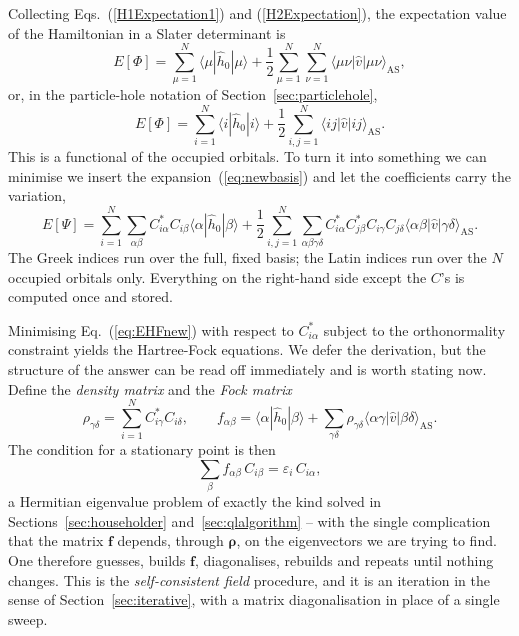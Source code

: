 Collecting Eqs.~(\ref{H1Expectation1}) and (\ref{H2Expectation}), the
expectation value of the Hamiltonian in a Slater determinant is
\begin{equation}
  E[\Phi]
   = \sum_{\mu=1}^{N}\langle\mu|\hat{h}_0|\mu\rangle
   + \frac{1}{2}\sum_{\mu=1}^{N}\sum_{\nu=1}^{N}
     \langle\mu\nu|\hat{v}|\mu\nu\rangle_{\mathrm{AS}} ,
  \label{eq:EHF}
\end{equation}
or, in the particle-hole notation of Section~\ref{sec:particlehole},
\begin{equation}
  E[\Phi] = \sum_{i=1}^{N}\langle i|\hat{h}_0|i\rangle
          + \frac{1}{2}\sum_{i,j=1}^{N}\langle ij|\hat{v}|ij\rangle_{\mathrm{AS}} .
  \label{FunctionalEPhi2}
\end{equation}
This is a functional of the occupied orbitals.  To turn it into something we
can minimise we insert the expansion~(\ref{eq:newbasis}) and let the
coefficients carry the variation,
\begin{equation}
  E[\Psi]
   = \sum_{i=1}^{N}\sum_{\alpha\beta}C^{*}_{i\alpha}C_{i\beta}
     \langle\alpha|\hat{h}_0|\beta\rangle
   + \frac{1}{2}\sum_{i,j=1}^{N}\sum_{\alpha\beta\gamma\delta}
     C^{*}_{i\alpha}C^{*}_{j\beta}C_{i\gamma}C_{j\delta}
     \langle\alpha\beta|\hat{v}|\gamma\delta\rangle_{\mathrm{AS}} .
  \label{eq:EHFnew}
\end{equation}
The Greek indices run over the full, fixed basis; the Latin indices run over
the $N$ occupied orbitals only.  Everything on the right-hand side except the
$C$'s is computed once and stored.

Minimising Eq.~(\ref{eq:EHFnew}) with respect to $C^{*}_{i\alpha}$ subject to
the orthonormality constraint yields the Hartree-Fock equations.  We defer
the derivation, but the structure of the answer can be read off immediately
and is worth stating now.  Define the \emph{density matrix} and the
\emph{Fock matrix}
\begin{equation}
  \rho_{\gamma\delta} = \sum_{i=1}^{N} C^{*}_{i\gamma}C_{i\delta},
  \qquad
  f_{\alpha\beta} = \langle\alpha|\hat{h}_0|\beta\rangle
    + \sum_{\gamma\delta}\rho_{\gamma\delta}
      \langle\alpha\gamma|\hat{v}|\beta\delta\rangle_{\mathrm{AS}} .
  \label{eq:2-fock}
\end{equation}
The condition for a stationary point is then
\begin{equation}
  \sum_{\beta} f_{\alpha\beta}\,C_{i\beta} = \varepsilon_i\,C_{i\alpha},
  \label{eq:2-hfequations}
\end{equation}
a Hermitian eigenvalue problem of exactly the kind solved in
Sections~\ref{sec:householder} and~\ref{sec:qlalgorithm} -- with the single
complication that the matrix $\bm{f}$ depends, through $\bm{\rho}$, on the
eigenvectors we are trying to find.  One therefore guesses, builds $\bm{f}$,
diagonalises, rebuilds and repeats until nothing changes.  This is the
\emph{self-consistent field} procedure, and it is an iteration in the sense of
Section~\ref{sec:iterative}, with a matrix diagonalisation in place of a
single sweep.

